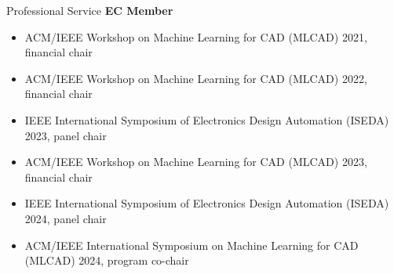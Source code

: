 \begin{rSection}{Professional Service}
\textbf{EC Member}
\begin{itemize}
    \item ACM/IEEE Workshop on Machine Learning for CAD (MLCAD) 2021, financial chair
    \item ACM/IEEE Workshop on Machine Learning for CAD (MLCAD) 2022, financial chair
    \item IEEE International Symposium of Electronics Design Automation (ISEDA) 2023, panel chair
    \item ACM/IEEE Workshop on Machine Learning for CAD (MLCAD) 2023, financial chair
    \item IEEE International Symposium of Electronics Design Automation (ISEDA) 2024, panel chair
    \item ACM/IEEE International Symposium on Machine Learning for CAD (MLCAD) 2024, program co-chair
\end{itemize}

\end{rSection}
